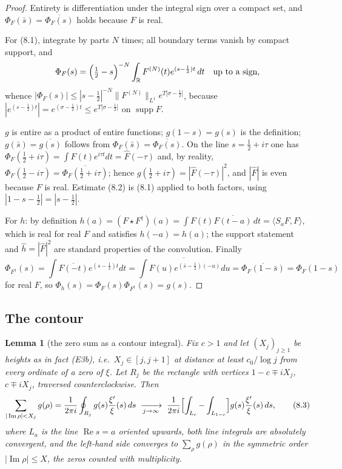 \documentclass[11pt]{amsart}
\newtheorem{lemma}[theorem]{Lemma}
\theoremstyle{definition}
\theoremstyle{remark}
\newcommand{\R}{\mathbb R}
\newcommand{\Rel}{\operatorname{Re}}
\newcommand{\Iml}{\operatorname{Im}}
\newcommand{\supp}{\operatorname{supp}}
\begin{document}
\begin{proof}
Entirety is differentiation under the integral sign over a compact set, and
$\Phi_F(\bar s)=\overline{\Phi_F(s)}$ holds because $F$ is real.

For (8.1), integrate by parts $N$ times; all boundary terms vanish by compact
support, and
\[
  \Phi_F(s)=\Bigl(\tfrac12-s\Bigr)^{-N}\int_\R F^{(N)}(t)e^{(s-\frac12)t}\,dt
  \quad\text{up to a sign,}
\]
whence $|\Phi_F(s)|\le|s-\tfrac12|^{-N}\|F^{(N)}\|_{L^1}e^{T|\sigma-\frac12|}$,
because $|e^{(s-\frac12)t}|=e^{(\sigma-\frac12)t}\le e^{T|\sigma-\frac12|}$ on
$\supp F$.

$g$ is entire as a product of entire functions; $g(1-s)=g(s)$ is the
definition; $g(\bar s)=\overline{g(s)}$ follows from
$\Phi_F(\bar s)=\overline{\Phi_F(s)}$.  On the line $s=\tfrac12+i\tau$ one has
$\Phi_F(\tfrac12+i\tau)=\int F(t)e^{i\tau t}dt=\hat F(-\tau)$ and, by reality,
$\Phi_F(\tfrac12-i\tau)=\overline{\Phi_F(\tfrac12+i\tau)}$; hence
$g(\tfrac12+i\tau)=|\hat F(-\tau)|^2$, and $|\hat F|$ is even because $F$ is
real.  Estimate (8.2) is (8.1) applied to both factors, using
$|1-s-\tfrac12|=|s-\tfrac12|$.

For $h$: by definition
$h(a)=(F\star F^\dagger)(a)=\int F(t)\overline{F(t-a)}\,dt=\langle S_aF,F\rangle$,
which is real for real $F$ and satisfies $h(-a)=h(a)$; the support statement
and $\hat h=|\hat F|^2$ are standard properties of the convolution.  Finally
\[
  \Phi_{F^\dagger}(s)=\int\overline{F(-t)}e^{(s-\frac12)t}dt
  =\overline{\int F(u)e^{(\bar s-\frac12)(-u)}du}
  =\overline{\Phi_F(1-\bar s)}=\Phi_F(1-s)
\]
for real $F$, so $\Phi_h(s)=\Phi_F(s)\Phi_{F^\dagger}(s)=g(s)$.
\end{proof}

\subsection{The contour}

\begin{lemma}[the zero sum as a contour integral]
\label{lem:contour}
Fix $c>1$ and let $(X_j)_{j\ge1}$ be heights as in fact \emph{(E3b)}, i.e.\
$X_j\in[j,j+1]$ at distance at least $c_0/\log j$ from every ordinate of a zero
of $\xi$.  Let $R_j$ be the rectangle with vertices $1-c\mp iX_j$, $c\mp iX_j$,
traversed counterclockwise.  Then
\begin{equation}
  \sum_{|\Iml\rho|<X_j}g(\rho)
   =\frac1{2\pi i}\oint_{R_j}g(s)\frac{\xi'}{\xi}(s)\,ds
   \;\xrightarrow[j\to\infty]{}\;
   \frac1{2\pi i}\Bigl[\int_{L_c}-\int_{L_{1-c}}\Bigr]
     g(s)\frac{\xi'}{\xi}(s)\,ds ,
\tag{8.3}
\end{equation}
where $L_a$ is the line $\Rel s=a$ oriented upwards, both line integrals are
absolutely convergent, and the left-hand side converges to $\sum_\rho g(\rho)$
in the symmetric order $|\Iml\rho|\le X$, the zeros counted with multiplicity.
\end{lemma}
\end{document}
